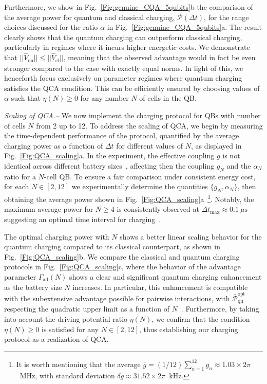 \documentclass[aps,prl,epsfigure,twocolumn,superscriptaddress]{revtex4-2}
\newcommand{\Pcal}{\mathcal{P}}
\newcommand{\1}{\mathbbm{1}}
\newcommand{\SubFig}[2]{\ref{#1}{\color{blue}#2}}
\newcommand{\RefB}[1]{{\color{black}#1}}
\newcommand{\RefC}[1]{{\color{black}#1}}
\begin{document}
	Furthermore, we show in Fig.~\SubFig{Fig:genuine_CQA_5qubits}{b} the comparison of the average power for quantum and classical charging, $\bar{\Pcal} (\Delta t)$, for the range choices discussed for the ratio $\alpha$ in Fig.~\SubFig{Fig:genuine_CQA_5qubits}{a}. The result clearly shows that the quantum charging can outperform classical charging, particularly in regimes where it incurs higher energetic costs. \RefB{We demonstrate that $||\hat{V}_{\mathrm{qu}}|| \leq ||\hat{V}_{\mathrm{cl}}||$, meaning that the observed advantage would in fact be even stronger compared to the case with exactly equal norms.} In light of this, we henceforth focus exclusively on parameter regimes where quantum charging satisfies \RefC{the QCA condition}. This can be efficiently ensured by choosing values of $\alpha$ such that $\eta(N) \geq 0$ for any number $N$ of cells in the QB.

	\emph{\RefC{Scaling of QCA.}--} We now implement the charging protocol for QBs with number of cells $N$ from 2 up to 12. To address the scaling \RefC{of QCA}, we begin by measuring the time-dependent performance of the protocol, quantified by the average charging power as a function of $\Delta t$ for different values of $N$, as displayed in Fig.~\SubFig{Fig:QCA_scaling}{a}. In the experiment, the effective coupling $g$ is not identical across different battery sizes~\cite{SM}, affecting then the coupling $g_{N}$ and the $\alpha_{N}$ ratio for a $N$-cell QB. To ensure a fair comparison under consistent energy cost, for each $N \in [2,12]$ we experimentally determine the quantities $\{g_{N},\alpha_{N}\}$, then obtaining the average power shown in Fig.~\SubFig{Fig:QCA_scaling}{a}~\footnote{It is worth mentioning that the average $\bar{g} = (1/12)\sum_{n=1}^{12} g_{n} \approx 1.03 \times 2\pi$~MHz, with standard deviation $\delta g \approx 31.52 \times 2\pi $~kHz.}. Notably, the maximum average power for $N\geq 4$ is consistently observed at $\Delta t_{\mathrm{max}} \approx 0.1~\mu\mathrm{s}$ suggesting an optimal time interval for charging~\cite{SM}.

	The optimal charging power with $N$ shows a better linear scaling behavior for the quantum charging compared to its classical counterpart, as shown in Fig.~\SubFig{Fig:QCA_scaling}{b}. We compare the classical and quantum charging protocols in Fig.~\SubFig{Fig:QCA_scaling}{c}, where the behavior of the advantage parameter $\Gamma_{\mathrm{ad}}(N)$ shows a clear and significant quantum charging enhancement as the battery size $N$ increases. In particular, this enhancement is compatible with the subextensive advantage possible for pairwise interactions, with $\bar{\Pcal}^{\mathrm{opt}}_{\mathrm{qu}}$ respecting the quadratic upper limit as a function of $N$~\cite{Kim:22}. Furthermore, by taking into account the driving potential ratio $\eta(N)$, we confirm that the condition $\eta(N) \geq 0$ is satisfied for any $N \in [2,12]$, thus establishing our charging protocol as \RefC{a realization of QCA}.
\end{document}
